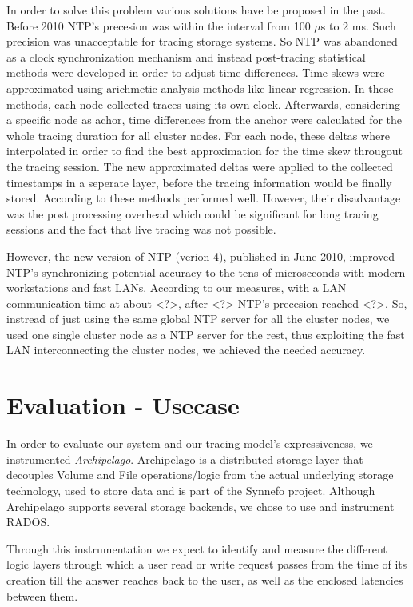 \documentclass[a4paper,10pt,twocolumn]{article}
\begin{document}
In order to solve this problem various solutions have be proposed in the past.
Before 2010 NTP's precesion was within the interval from 100 $\mu$s to 2 ms.
Such precision was unacceptable for tracing storage systems. So NTP was
abandoned as a clock synchronization mechanism and instead post-tracing
statistical methods were developed in order to adjust time differences. Time
skews were approximated using arichmetic analysis methods like linear
regression. In these methods, each node collected traces using its own clock.
Afterwards, considering a specific node as achor, time differences from the
anchor were calculated for the whole tracing duration for all cluster nodes.
For each node, these deltas where interpolated in order to find the best
approximation for the time skew througout the tracing session. The new
approximated deltas were applied to the collected timestamps in a seperate
layer, before the tracing information would be finally stored. According to
\cite{hp} these methods performed well. However, their disadvantage was the post
processing overhead which could be significant for long tracing sessions and the
fact that live tracing was not possible.

However, the new version of NTP (verion 4), published in June 2010, improved
NTP's synchronizing potential accuracy to the tens of microseconds with modern
workstations and fast LANs. According to our measures, with a LAN communication
time at about <?>, after <?> NTP's precesion reached <?>.  So, instread of just
using the same global NTP server for all the cluster nodes, we used one single
cluster node as a NTP server for the rest, thus exploiting the fast LAN
interconnecting the cluster nodes, we achieved the needed accuracy.
 
\section{Evaluation - Usecase}

In order to evaluate our system and our tracing model's expressiveness, we
instrumented \emph{Archipelago}\cite{archip}. Archipelago is a distributed
storage layer that decouples Volume and File operations/logic from the actual
underlying storage technology, used to store data and is part of the Synnefo
project\cite{synnefo}. Although Archipelago supports several storage backends,
we chose to use and instrument RADOS\cite{rados}. 

Through this instrumentation we expect to identify and measure the different
logic layers through which a user read or write request passes from the time of
its creation till the answer reaches back to the user, as well as the enclosed
latencies between them.
\end{document}
